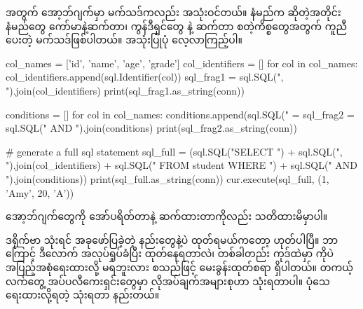  အတွက်  အော့ဘ်ဂျက်မှာ  မက်သဒ်ကလည်း အသုံးဝင်တယ်။ နံမည်က  ဆိုတဲ့အတိုင်း  နံမည်တွေ ကော်မာနဲ့ဆက်တာ၊ ကွန်ဒီရှင်တွေ \fEn{/} နဲ့ ဆက်တာ စတဲ့ကိစ္စတွေအတွက် ကူညီပေးတဲ့ မက်သဒ်ဖြစ်ပါတယ်။ အသုံးပြုပုံ လေ့လာကြည့်ပါ။
%
\begin{py}
col_names = ['id', 'name', 'age', 'grade']
col_identifiers = []
for col in col_names:
    col_identifiers.append(sql.Identifier(col))
sql_frag1 = sql.SQL(", ").join(col_identifiers)
print(sql_frag1.as_string(conn))

conditions = []
for col in col_names:
    conditions.append(sql.SQL("{} = %
sql_frag2 = sql.SQL(" AND ").join(conditions)
print(sql_frag2.as_string(conn))

# generate a full sql statement
sql_full = (sql.SQL("SELECT ")
            + sql.SQL(", ").join(col_identifiers)
            + sql.SQL(" FROM student WHERE ")
            + sql.SQL(" AND ").join(conditions))
print(sql_full.as_string(conn))
cur.execute(sql_full, (1, 'Amy', 20, 'A'))
\end{py}
%
 အော့ဘ်ဂျက်တွေကို \fCode{+} အော်ပရိတ်တာနဲ့  ဆက်ထားတာကိုလည်း သတိထားမိမှာပါ။

 ဒရိုက်ဗာ သုံးရင် အခုဖော်ပြခဲ့တဲ့ နည်းတွေနဲ့ပဲ  ထုတ်ရမယ်ကတော့ ဟုတ်ပါပြီ။ ဘာကြောင့် ဒီလောက် အလုပ်ရှုပ်ခံပြီး  ထုတ်နေရတာလဲ၊ တစ်ခါတည်း ကုဒ်ထဲမှာ  ကိုပဲ အပြည့်အစုံရေးထားလို့ မရဘူးလား စသည်ဖြင့် မေးခွန်းထုတ်စရာ ရှိပါတယ်။ တကယ့်လက်တွေ့ အပ်ပလီကေးရှင်းတွေမှာ လိုအပ်ချက်အများစုဟာ  သုံးရတာပါ။ ပုံသေရေးထားလို့ရတဲ့  သုံးရတာ နည်းတယ်။ 

